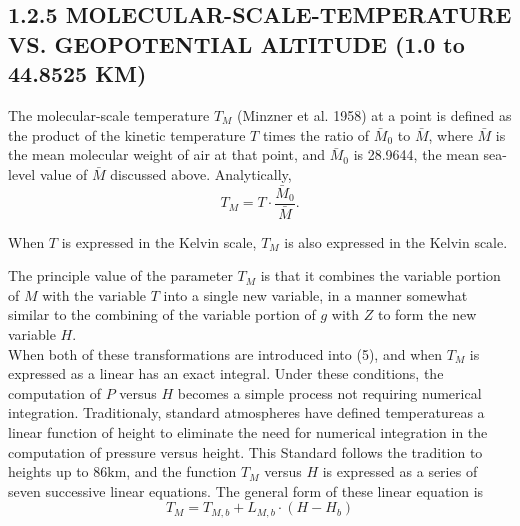 \documentclass{article}
\begin{document}
\subsection*{1.2.5 MOLECULAR-SCALE-TEMPERATURE VS. GEOPOTENTIAL ALTITUDE (1.0 to 44.8525 KM)}

The molecular-scale temperature \(T_M\) (Minzner et al. 1958) at a point is defined as the product of the kinetic temperature \(T\) times the ratio of \(\bar{M}_0\) to \(\bar{M}\), where \(\bar{M}\) is the mean molecular weight of air at that point, and \(\bar{M}_0\) is 28.9644, the mean sea-level value of \(\bar{M}\) discussed above. Analytically,
\begin{equation}
  T_M = T \cdot \frac{\bar{M}_0}{\bar{M}}. \tag{22}
\end{equation}

When \(T\) is expressed in the Kelvin scale, \(T_M\) is also expressed in the Kelvin scale.

The principle value of the parameter \(T_M\) is that it combines the variable portion of \(M\) with the variable \(T\) into a single new variable, in a manner somewhat similar to the combining of the variable portion of \(g\) with \(Z\) to form the new variable \(H\).\\
When both of these transformations are introduced into (5), and when \(T_M\) is expressed as a linear has an exact integral. Under these conditions, the computation of \(P\) versus \(H\) becomes a simple process not requiring numerical integration. Traditionaly, standard atmospheres have defined temperatureas a linear function of height to eliminate the need for numerical integration in the computation of pressure versus height. This Standard follows the tradition to heights up to 86km, and the function \(T_M\) versus \(H\) is expressed as a series of seven successive linear equations. The general form of these linear equation is 
\begin{equation}
  T_M = T_{M,b} + L_{M,b}\cdot (H - H_b) 
  \tag{23}
\end{equation}
\end{document}
